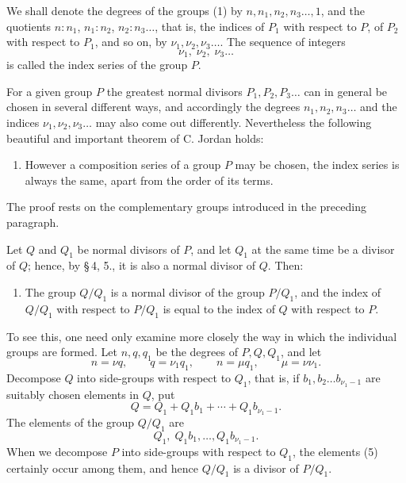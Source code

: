 \documentclass[11pt]{article}
\begin{document}
We shall denote the degrees of the groups (1) by $n,n_1,n_2,n_3\ldots,1$, and the quotients $n:n_1$, $n_1:n_2$, $n_2:n_3\ldots$, that is, the indices of $P_1$ with respect to $P$, of $P_2$ with respect to $P_1$, and so on, by $\nu_1,\nu_2,\nu_3\ldots$. The sequence of integers
\begin{equation}
\nu_1,\;\nu_2,\;\nu_3\ldots
\tag{2}
\end{equation}
is called the index series of the group $P$.

For a given group $P$ the greatest normal divisors $P_1,P_2,P_3\ldots$ can in general be chosen in several different ways, and accordingly the degrees $n_1,n_2,n_3\ldots$ and the indices $\nu_1,\nu_2,\nu_3\ldots$ may also come out differently. Nevertheless the following beautiful and important theorem of C. Jordan holds:

\begin{enumerate}[label=\Roman*.]
\item However a composition series of a group $P$ may be chosen, the index series is always the same, apart from the order of its terms.
\end{enumerate}

The proof rests on the complementary groups introduced in the preceding paragraph.

Let $Q$ and $Q_1$ be normal divisors of $P$, and let $Q_1$ at the same time be a divisor of $Q$; hence, by \S\,4, 5., it is also a normal divisor of $Q$. Then:

\begin{enumerate}[label=\arabic*.]
\item The group $Q/Q_1$ is a normal divisor of the group $P/Q_1$, and the index of $Q/Q_1$ with respect to $P/Q_1$ is equal to the index of $Q$ with respect to $P$.
\end{enumerate}

To see this, one need only examine more closely the way in which the individual groups are formed. Let $n,q,q_1$ be the degrees of $P,Q,Q_1$, and let
\begin{equation}
n=\nu q,
\qquad q=\nu_1q_1,
\qquad n=\mu q_1,
\qquad \mu=\nu\nu_1.
\tag{3}
\end{equation}
Decompose $Q$ into side-groups with respect to $Q_1$, that is, if $b_1,b_2\ldots b_{\nu_1-1}$ are suitably chosen elements in $Q$, put
\begin{equation}
Q=Q_1+Q_1b_1+\cdots+Q_1b_{\nu_1-1}.
\tag{4}
\end{equation}
The elements of the group $Q/Q_1$ are
\begin{equation}
Q_1,\;Q_1b_1,\ldots,Q_1b_{\nu_1-1}.
\tag{5}
\end{equation}
When we decompose $P$ into side-groups with respect to $Q_1$, the elements (5) certainly occur among them, and hence $Q/Q_1$ is a divisor of $P/Q_1$.
\end{document}
